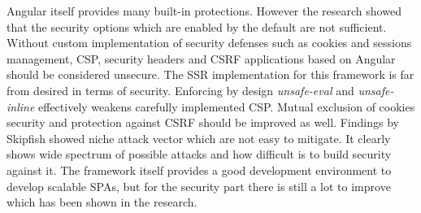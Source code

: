 \documentclass{article} %
\begin{document}
\newline
Angular itself provides many built-in protections. However the research showed that the security options which are enabled by the default are not sufficient. Without custom implementation of security defenses such as cookies and sessions management, CSP, security headers and CSRF applications based on Angular should be considered unsecure. The SSR implementation for this framework is far from desired in terms of security. Enforcing by design \textit{unsafe-eval} and \textit{unsafe-inline} effectively weakens carefully implemented CSP. Mutual exclusion of cookies security and protection against CSRF should be improved as well. Findings by Skipfish showed niche attack vector which are not easy to mitigate. It clearly shows wide spectrum of possible attacks and how difficult is to build security against it. The framework itself provides a good development environment to develop scalable SPAs, but for the security part there is still a lot to improve which has been shown in the research.
\clearpage
\end{document}
